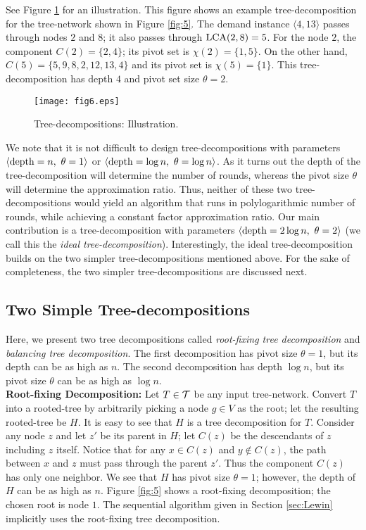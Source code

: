 \documentclass[11pt]{article}
\newcommand{\calT} {{\cal T}}
\newcommand{\LCA} {{\rm LCA}}
\newcommand{\pair}[2] {\langle #1,#2 \rangle}
\newcommand{\depth} {{\rm depth}}
\begin{document}
See Figure \ref{fig:6} for an illustration.
This figure shows an example tree-decomposition for the tree-network shown in Figure \ref{fig:5}.
The demand instance $\pair{4}{13}$ passes through nodes $2$ and $8$; it also
passes through $\LCA(2,8)=5$. For the node $2$, the component $C(2)=\{2,4\}$; its pivot set is $\chi(2)=\{1,5\}$.
On the other hand, $C(5)=\{5,9,8,2,12,13,4\}$ and its pivot set is $\chi(5)=\{1\}$.
This tree-decomposition has depth $4$ and pivot set size $\theta=2$.

\begin{figure}
\centering
\texttt{[image: fig6.eps]}
\caption{
Tree-decompositions: Illustration.
}
\label{fig:6}
\end{figure}

We note that it is not difficult to design tree-decompositions with 
parameters $\pair{\depth=n}{~\theta=1}$ or $\pair{\depth=\log n}{~\theta=\log n}$.
As it turns out the depth of the tree-decomposition will determine the number of rounds,
whereas the pivot size $\theta$ will determine the approximation ratio.
Thus, neither of these two tree-decompositions would yield an algorithm
that runs in polylogarithmic number of rounds, while achieving a constant factor approximation ratio.
Our main contribution is a tree-decomposition with parameters $\pair{\depth=2\log n}{~\theta=2}$
(we call this the {\em ideal tree-decomposition}).
Interestingly, the ideal tree-decomposition builds on the two simpler tree-decompositions mentioned above.
For the sake of completeness, the two simpler tree-decompositions are discussed next.

\subsection{Two Simple Tree-decompositions}
\label{sec:simple-trees}
Here, we present two tree decompositions called {\em root-fixing tree decomposition}
and {\em balancing tree decomposition}. The first decomposition has pivot size $\theta=1$,
but its depth can be as high as $n$. The second decomposition has depth $\log n$,
but its pivot size $\theta$ can be as high as $\log n$.
\\

\noindent
{\bf Root-fixing Decomposition: } 
Let $T\in \calT$ be any input tree-network. Convert $T$ into a rooted-tree by 
arbitrarily picking a node $g\in V$ as the root; let the resulting rooted-tree be $H$.
It is easy to see that $H$ is a tree decomposition for $T$.
Consider any node $z$ and let $z'$ be its parent in $H$; let $C(z)$ be the descendants of $z$ including $z$ itself.
Notice that for any $x\in C(z)$ and $y\not\in C(z)$, the path between $x$ and $z$ must pass through
the parent $z'$. Thus the component $C(z)$ has only one neighbor.
We see that $H$ has pivot size $\theta=1$; however, the depth of $H$ can be as high as $n$.
Figure \ref{fig:5} shows a root-fixing decomposition; the chosen root is node $1$.
The sequential algorithm given in Section \ref{sec:Lewin} implicitly uses the root-fixing tree decomposition.
\\
\end{document}
